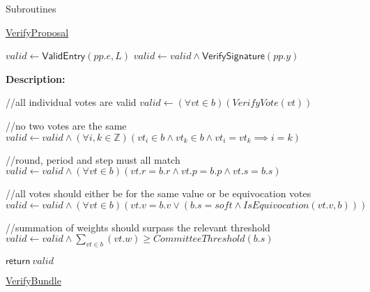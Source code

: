 \documentclass[10pt,a4paper]{article}
\begin{document}
\begin{section}{Subroutines}

\begin{algorithm}[H]
    \caption{\underline{VerifyProposal}}
    \label{algo:verify-proposal}
    \begin{algorithmic}[1]

    \State $valid \gets \mathsf{ValidEntry}(pp.e, L)$
    \State $valid \gets valid \land \mathsf{VerifySignature}(pp.y)$

    \EndFunction
    \end{algorithmic}
\end{algorithm}

\noindent \textbf{Description:}\\


\begin{algorithm}[H]\label{algo:verify-bundle}
    \begin{algorithmic}[1]

    //all individual votes are valid
    \State $valid \gets (\forall vt \in b)(VerifyVote(vt))$
    
    //no two votes are the same
    \State $valid \gets valid \land (\forall i,k \in \mathbb{Z})(vt_i \in b \land vt_k \in b \land vt_i = vt_k \implies i=k)$

    //round, period and step must all match
    \State $valid \gets valid \land (\forall vt \in b)(vt.r = b.r \land vt.p = b.p \land vt.s = b.s)$
  
    //all votes should either be for the same value or be equivocation votes
    \State $valid \gets valid \land (\forall vt \in b)(vt.v = b.v \lor (b.s = soft \land IsEquivocation(vt.v, b)))$

    //summation of weights should surpass the relevant threshold
    \State $valid \gets valid \land  \sum_{vt \in b}(vt.w) \geq CommitteeThreshold(b.s)$

    \State $\mathsf{return} \ valid$

    \EndFunction
    \end{algorithmic}
    \caption{\underline{VerifyBundle}}
\end{algorithm}


\end{section}
\end{document}

